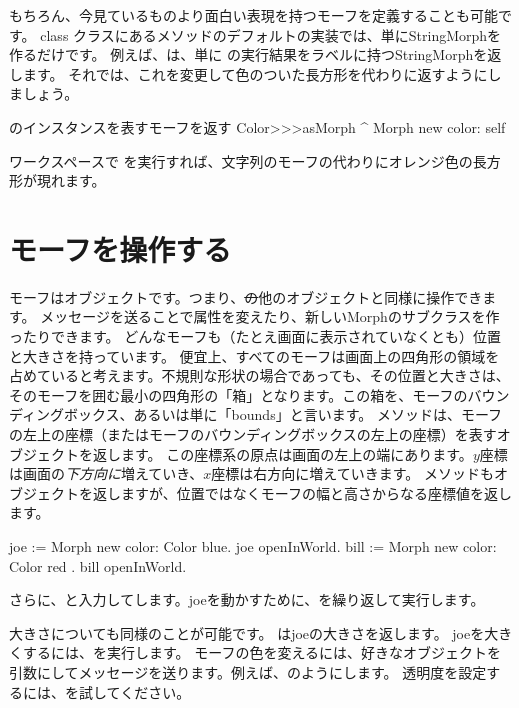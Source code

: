 \documentclass[a4paper,10pt,twoside]{book}
\begin{document}
もちろん、今見ているものより面白い表現を持つモーフを定義することも可能です。
class クラスにあるメソッドのデフォルトの実装では、単にStringMorphを作るだけです。
例えば、は、単に の実行結果をラベルに持つStringMorphを返します。
それでは、これを変更して色のついた長方形を代わりに返すようにしましょう。

\begin{method}{のインスタンスを表すモーフを返す}
Color>>>asMorph
	^ Morph new color: self
\end{method}
\noindent
ワークスペースで を実行すれば、文字列のモーフの代わりにオレンジ色の長方形が現れます。


\section{モーフを操作する}

モーフはオブジェクトです。つまり、\st の他のオブジェクトと同様に操作できます。
メッセージを送ることで属性を変えたり、新しいMorphのサブクラスを作ったりできます。
どんなモーフも（たとえ画面に表示されていなくとも）位置と大きさを持っています。
便宜上、すべてのモーフは画面上の四角形の領域を占めていると考えます。不規則な形状の場合であっても、その位置と大きさは、そのモーフを囲む最小の四角形の「箱」となります。この箱を、モーフのバウンディングボックス、あるいは単に「bounds」と言います。
メソッドは、モーフの左上の座標（またはモーフのバウンディングボックスの左上の座標）を表すオブジェクトを返します。
この座標系の原点は画面の左上の端にあります。$y$座標は画面の\emph{下方向に}増えていき、$x$座標は右方向に増えていきます。
メソッドもオブジェクトを返しますが、位置ではなくモーフの幅と高さからなる座標値を返します。

\begin{code}{}
joe := Morph new color: Color blue.
joe openInWorld.
bill := Morph new color: Color red .
bill openInWorld.
\end{code}
\noindent
さらに、と入力してします。joeを動かすために、を繰り返して実行します。

大きさについても同様のことが可能です。
 はjoeの大きさを返します。
joeを大きくするには、を実行します。
モーフの色を変えるには、好きなオブジェクトを引数にしてメッセージを送ります。例えば、のようにします。
透明度を設定するには、を試してください。
\end{document}
